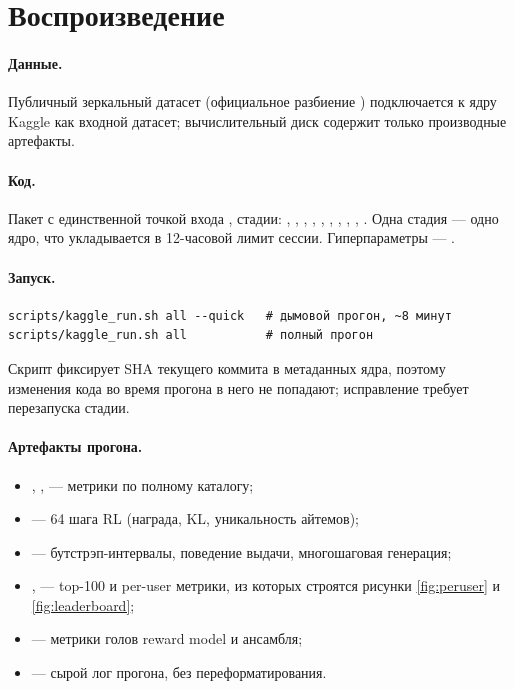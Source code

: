 \appendix
\section{Воспроизведение}

\paragraph{Данные.} Публичный зеркальный датасет
 (официальное разбиение
) подключается к ядру Kaggle
как входной датасет; вычислительный диск содержит только производные
артефакты.

\paragraph{Код.} Пакет  с единственной точкой входа
, стадии: , , ,
, , , , ,
, . Одна стадия --- одно ядро, что укладывается в
12-часовой лимит сессии. Гиперпараметры --- .

\paragraph{Запуск.}
\begin{verbatim}
scripts/kaggle_run.sh all --quick   # дымовой прогон, ~8 минут
scripts/kaggle_run.sh all           # полный прогон
\end{verbatim}

Скрипт фиксирует SHA текущего коммита в метаданных ядра, поэтому изменения
кода во время прогона в него не попадают; исправление требует перезапуска
стадии.

\paragraph{Артефакты прогона.}
\begin{itemize}[leftmargin=1.2em,itemsep=1pt,topsep=2pt]
  \item {}, ,
         --- метрики по полному каталогу;
  \item {} --- 64 шага RL (награда, KL,
        уникальность айтемов);
  \item {} --- бутстрэп-интервалы, поведение выдачи,
        многошаговая генерация;
  \item {},  --- top-100
        и per-user метрики, из которых строятся рисунки
        \ref{fig:peruser} и \ref{fig:leaderboard};
  \item {} --- метрики голов reward model и ансамбля;
  \item {} --- сырой лог прогона,
        без переформатирования.
\end{itemize}

